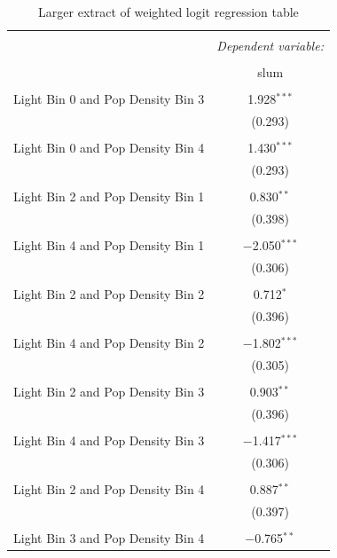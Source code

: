 \begin{table}[!htbp] \centering 
  \caption{Larger extract of weighted logit regression table} 
  \label{appendix weighted logit} 
\begin{tabular}{@{\extracolsep{5pt}}lc} 
\\[-1.8ex]\hline 
\hline \\[-1.8ex] 
 & \multicolumn{1}{c}{\textit{Dependent variable:}} \\ 
\cline{2-2} 
\\[-1.8ex] & slum \\ 
\hline \\[-1.8ex]
 Light Bin 0 and Pop Density Bin 3 & 1.928$^{***}$ \\ 
  & (0.293) \\ 
  & \\ 
 Light Bin 0 and Pop Density Bin 4 & 1.430$^{***}$ \\ 
  & (0.293) \\ 
  & \\ 
 Light Bin 2 and Pop Density Bin 1 & 0.830$^{**}$ \\ 
  & (0.398) \\ 
  & \\
 Light Bin 4 and Pop Density Bin 1 & $-$2.050$^{***}$ \\ 
  & (0.306) \\ 
  & \\ 
 Light Bin 2 and Pop Density Bin 2 & 0.712$^{*}$ \\ 
  & (0.396) \\ 
  & \\ 
 Light Bin 4 and Pop Density Bin 2 & $-$1.802$^{***}$ \\ 
  & (0.305) \\ 
  & \\ 
 Light Bin 2 and Pop Density Bin 3 & 0.903$^{**}$ \\ 
  & (0.396) \\ 
  & \\ 
 Light Bin 4 and Pop Density Bin 3 & $-$1.417$^{***}$ \\ 
  & (0.306) \\ 
  & \\ 
 Light Bin 2 and Pop Density Bin 4 & 0.887$^{**}$ \\ 
  & (0.397) \\ 
  & \\ 
 Light Bin 3 and Pop Density Bin 4 & $-$0.765$^{**}$ \\ 

\end{tabular}
\end{table}
